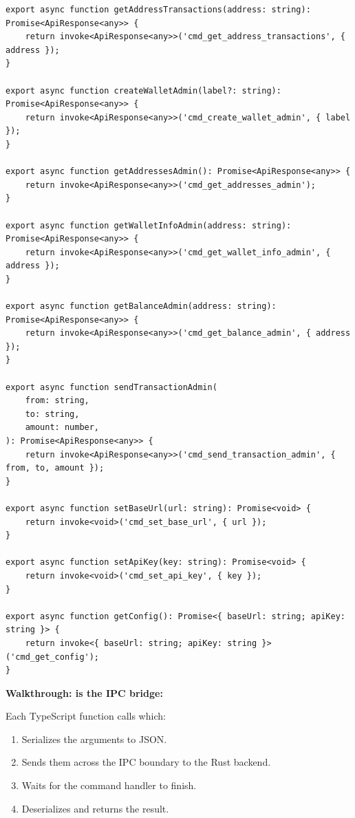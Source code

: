 \begin{listing}[H]
\begin{verbatim}
export async function getAddressTransactions(address: string): Promise<ApiResponse<any>> {
    return invoke<ApiResponse<any>>('cmd_get_address_transactions', { address });
}

export async function createWalletAdmin(label?: string): Promise<ApiResponse<any>> {
    return invoke<ApiResponse<any>>('cmd_create_wallet_admin', { label });
}

export async function getAddressesAdmin(): Promise<ApiResponse<any>> {
    return invoke<ApiResponse<any>>('cmd_get_addresses_admin');
}

export async function getWalletInfoAdmin(address: string): Promise<ApiResponse<any>> {
    return invoke<ApiResponse<any>>('cmd_get_wallet_info_admin', { address });
}

export async function getBalanceAdmin(address: string): Promise<ApiResponse<any>> {
    return invoke<ApiResponse<any>>('cmd_get_balance_admin', { address });
}

export async function sendTransactionAdmin(
    from: string,
    to: string,
    amount: number,
): Promise<ApiResponse<any>> {
    return invoke<ApiResponse<any>>('cmd_send_transaction_admin', { from, to, amount });
}

export async function setBaseUrl(url: string): Promise<void> {
    return invoke<void>('cmd_set_base_url', { url });
}

export async function setApiKey(key: string): Promise<void> {
    return invoke<void>('cmd_set_api_key', { key });
}

export async function getConfig(): Promise<{ baseUrl: string; apiKey: string }> {
    return invoke<{ baseUrl: string; apiKey: string }>('cmd_get_config');
}
\end{verbatim}
\end{listing}

\textbf{Walkthrough:  is the IPC bridge:}

Each TypeScript function calls  which:

\begin{enumerate}
  \item Serializes the arguments to JSON.
  \item Sends them across the IPC boundary to the Rust backend.
  \item Waits for the command handler to finish.
  \item Deserializes and returns the result.
\end{enumerate}

